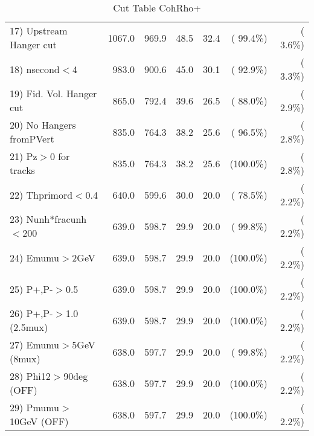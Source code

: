 \begin{table}[h!]
\begin{tabular}{||l||r|r|r|r|r|r||}
 17) Upstream Hanger cut  &       1067.0 &        969.9 &         48.5 &         32.4 & ( 99.4\%) & (  3.6\%) \\
 18) nsecond$<$4          &        983.0 &        900.6 &         45.0 &         30.1 & ( 92.9\%) & (  3.3\%) \\
 19) Fid. Vol. Hanger cut &        865.0 &        792.4 &         39.6 &         26.5 & ( 88.0\%) & (  2.9\%) \\
 20) No Hangers fromPVert &        835.0 &        764.3 &         38.2 &         25.6 & ( 96.5\%) & (  2.8\%) \\
 21) Pz$>$0 for tracks    &        835.0 &        764.3 &         38.2 &         25.6 & (100.0\%) & (  2.8\%) \\
 22) Thprimord$<$0.4      &        640.0 &        599.6 &         30.0 &         20.0 & ( 78.5\%) & (  2.2\%) \\
 23) Nunh*fracunh$<$200   &        639.0 &        598.7 &         29.9 &         20.0 & ( 99.8\%) & (  2.2\%) \\
 24) Emumu$>$2GeV         &        639.0 &        598.7 &         29.9 &         20.0 & (100.0\%) & (  2.2\%) \\
 25) P+,P-$>$0.5          &        639.0 &        598.7 &         29.9 &         20.0 & (100.0\%) & (  2.2\%) \\
 26) P+,P-$>$1.0 (2.5mux) &        639.0 &        598.7 &         29.9 &         20.0 & (100.0\%) & (  2.2\%) \\
 27) Emumu$>$5GeV  (8mux) &        638.0 &        597.7 &         29.9 &         20.0 & ( 99.8\%) & (  2.2\%) \\
 28) Phi12$>$90deg  (OFF) &        638.0 &        597.7 &         29.9 &         20.0 & (100.0\%) & (  2.2\%) \\
 29) Pmumu$>$10GeV  (OFF) &        638.0 &        597.7 &         29.9 &         20.0 & (100.0\%) & (  2.2\%) \\
 \hline
 \hline
 \end{tabular}
 \caption{Cut Table  CohRho+  }
 \label{tab-cutcohjpsi-mumu_cohrhop}
 \end{table}
